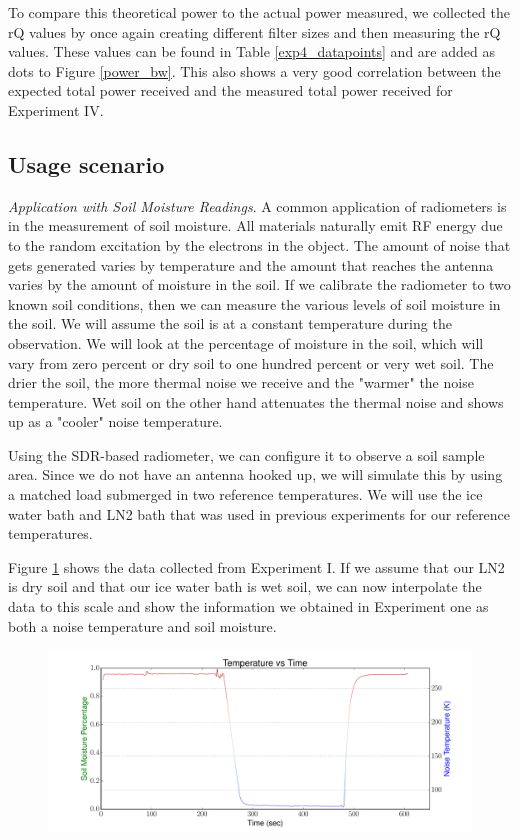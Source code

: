 To compare this theoretical power to the actual power measured, we collected the rQ values by once again creating different filter sizes and then measuring the rQ values.  These values can be found in Table \ref{exp4_datapoints} and are added as dots to Figure \ref{power_bw}.  This also shows a very good correlation between the expected total power received and the measured total power received for Experiment IV.

\subsection{Usage scenario}
\emph{Application with Soil Moisture Readings}.  A common application of radiometers is in the measurement of soil moisture.  All materials naturally emit RF energy due to the random excitation by the electrons in the object.  The amount of noise that gets generated varies by temperature and the amount that reaches the antenna varies by the amount of moisture in the soil.  If we calibrate the radiometer to two known soil conditions, then we can measure the various levels of soil moisture in the soil.  We will assume the soil is at a constant temperature during the observation.  We will look at the percentage of moisture in the soil, which will vary from zero percent or dry soil to one hundred percent or very wet soil.  The drier the soil, the more thermal noise we receive and the "warmer" the noise temperature.  Wet soil on the other hand attenuates the thermal noise and shows up as a "cooler" noise temperature.  

Using the SDR-based radiometer, we can configure it to observe a soil sample area.  Since we do not have an antenna hooked up, we will simulate this by using a matched load submerged in two reference temperatures.  We will use the ice water bath and LN2 bath that was used in previous experiments for our reference temperatures.

Figure \ref{SDR_soil} shows the data collected from Experiment I.  If we assume that our LN2 is dry soil and that our ice water bath is wet soil, we can now interpolate the data to this scale and show the information we obtained in Experiment one as both a noise temperature and soil moisture.

\begin{figure}[h!tb] \centering

\includegraphics[width=\textwidth]{Experiments/Exp1/sdr_soilmoisture.pdf}
\label{SDR_soil}
\end{figure}

